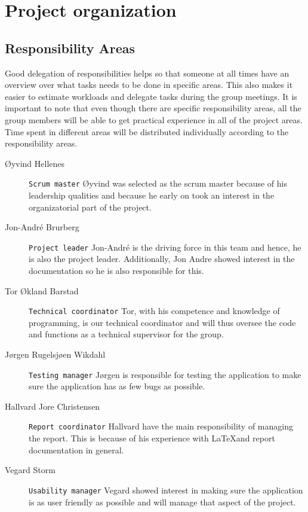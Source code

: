 \section{Project organization}
\thispagestyle{plain}
	\subsection{Responsibility Areas}

Good delegation of responsibilities helps so that someone at all times have an overview over what tasks needs to be done in specific areas. This also makes it easier to estimate workloads and delegate tasks during the group meetings. It is important to note that even though there are specific responsibility areas, all the group members will be able to get practical experience in all of the project areas. Time spent in different areas will be distributed individually according to the responsibility areas.

\begin{description}
\item[Øyvind Hellenes] \texttt{Scrum master} \hspace{8pt} Øyvind was selected as the scrum master because of his leadership qualities and because he early on took an interest in the organizatorial part of the project.
\item[Jon-André Brurberg] \texttt{Project leader}\hspace{8pt} Jon-André is the driving force in this team and hence, he is also the project leader. Additionally, Jon Andre showed interest in the documentation so he is also responsible for this.
\item[Tor Økland Barstad] \texttt{Technical coordinator} \hspace{8pt}Tor, with his competence and knowledge of programming, is our technical coordinator and will thus oversee the code and functions as a technical supervisor for the group.
\item[Jørgen Rugelsjøen Wikdahl] \texttt{Testing manager}\hspace{8pt} Jørgen is responsible for testing the application to make sure the application has as few bugs as possible.
\item[Hallvard Jore Christensen] \texttt{Report coordinator}  \hspace{8pt} Hallvard have the main responsibility of managing the report. This is because of his experience with \LaTeX and report documentation in general.
\item[Vegard Storm] \texttt{Usability manager}\hspace{8pt} Vegard showed interest in making sure the application is as user friendly as possible and will manage that aspect of the project.
\end{description}
	
